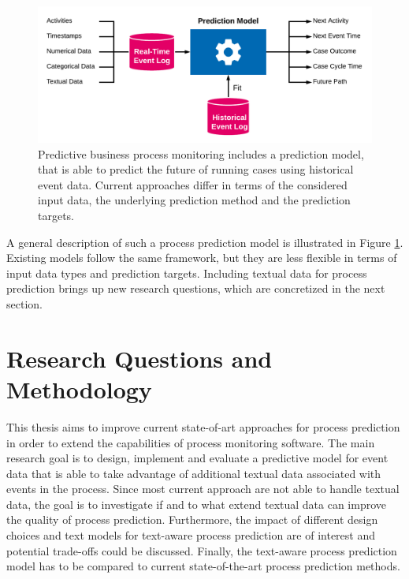 \begin{figure}[htbp!]
	\centering
	\includegraphics[width=\textwidth]{figures/problem-description}
	\caption[General process prediction model]{Predictive business process monitoring includes a prediction model, that is able to predict the future of running cases using historical event data. Current approaches differ in terms of the considered input data, the underlying prediction method and the prediction targets.}
	\label{fig:/problem-description}
\end{figure}

A general description of such a process prediction model is illustrated in Figure \ref{fig:/problem-description}.
Existing models follow the same framework, but they are less flexible in terms of input data types and prediction targets.
Including textual data for process prediction brings up new research questions, which are concretized in the next section.

\section{Research Questions and Methodology}\label{sec:methodology}

This thesis aims to improve current state-of-art approaches for process prediction in order to extend the capabilities of process monitoring software.
The main research goal is to design, implement and evaluate a predictive model for event data that is able to take advantage of additional textual data associated with events in the process.
Since most current approach are not able to handle textual data, the goal is to investigate if and to what extend textual data can improve the quality of process prediction.
Furthermore, the impact of different design choices and text models for text-aware process prediction are of interest and potential trade-offs could be discussed.
Finally, the text-aware process prediction model has to be compared to current state-of-the-art process prediction methods.

